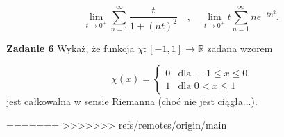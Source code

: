 \documentclass[a4paper,11pt]{article}
\begin{document}
\[
\lim_{t\to 0^+} \sum_{n=1}^\infty \frac{t}{1+(nt)^2} 
\quad , \quad
\lim_{t\to 0^+} t \sum_{n=1}^\infty ne^{-tn^2}
.\] 

\bigskip

\textbf{Zadanie 6} Wykaż, że funkcja $\chi: [-1,1] \to \mathbb{R}$ zadana
wzorem

 \[
\chi(x) = 
\begin{cases}
    0 & \text{dla~} -1 \le x \le 0 \\
    1 & \text{dla~} 0 < x \le  1
\end{cases}
\] 
jest całkowalna w sensie Riemanna (choć nie jest ciągła...).

\bigskip

=======
>>>>>>> refs/remotes/origin/main
\end{document}
